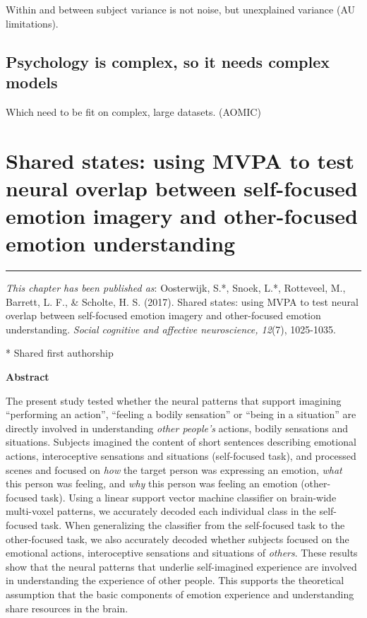 \documentclass[12pt,american,a4paper,oneside,]{memoir} %
\begin{document}
Within and between subject variance is not noise, but unexplained variance (AU limitations).

\hypertarget{psychology-is-complex-so-it-needs-complex-models}{%
\section{Psychology is complex, so it needs complex models}\label{psychology-is-complex-so-it-needs-complex-models}}

Which need to be fit on complex, large datasets. (AOMIC)

\hypertarget{shared-states}{%
\chapter{Shared states: using MVPA to test neural overlap between self-focused emotion imagery and other-focused emotion understanding}\label{shared-states}}


\vspace*{\fill}

\begin{center}\rule{0.5\linewidth}{0.5pt}\end{center}

\small

\noindent
\emph{This chapter has been published as}: Oosterwijk, S.*, Snoek, L.*, Rotteveel, M., Barrett, L. F., \& Scholte, H. S. (2017). Shared states: using MVPA to test neural overlap between self-focused emotion imagery and other-focused emotion understanding. \emph{Social cognitive and affective neuroscience, 12}(7), 1025-1035.

* Shared first authorship
\newpage
\normalsize

\textbf{Abstract}

The present study tested whether the neural patterns that support imagining ``performing an action'', ``feeling a bodily sensation'' or ``being in a situation'' are directly involved in understanding \emph{other people's} actions, bodily sensations and situations. Subjects imagined the content of short sentences describing emotional actions, interoceptive sensations and situations (self-focused task), and processed scenes and focused on \emph{how} the target person was expressing an emotion, \emph{what} this person was feeling, and \emph{why} this person was feeling an emotion (other-focused task). Using a linear support vector machine classifier on brain-wide multi-voxel patterns, we accurately decoded each individual class in the self-focused task. When generalizing the classifier from the self-focused task to the other-focused task, we also accurately decoded whether subjects focused on the emotional actions, interoceptive sensations and situations of \emph{others}. These results show that the neural patterns that underlie self-imagined experience are involved in understanding the experience of other people. This supports the theoretical assumption that the basic components of emotion experience and understanding share resources in the brain.
\end{document}
